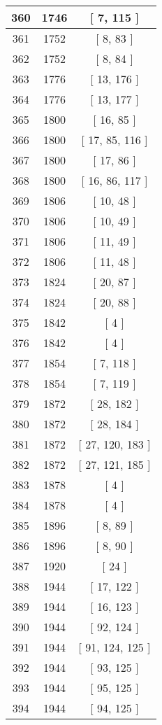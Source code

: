\begin{center}
\begin{longtable}[H]{|| c c c ||}
\hline
360 & 1746 & [ 7, 115 ] \\ 
\hline
361 & 1752 & [ 8, 83 ] \\ 
\hline
362 & 1752 & [ 8, 84 ] \\ 
\hline
363 & 1776 & [ 13, 176 ] \\ 
\hline
364 & 1776 & [ 13, 177 ] \\ 
\hline
365 & 1800 & [ 16, 85 ] \\ 
\hline
366 & 1800 & [ 17, 85, 116 ] \\ 
\hline
367 & 1800 & [ 17, 86 ] \\ 
\hline
368 & 1800 & [ 16, 86, 117 ] \\ 
\hline
369 & 1806 & [ 10, 48 ] \\ 
\hline
370 & 1806 & [ 10, 49 ] \\ 
\hline
371 & 1806 & [ 11, 49 ] \\ 
\hline
372 & 1806 & [ 11, 48 ] \\ 
\hline
373 & 1824 & [ 20, 87 ] \\ 
\hline
374 & 1824 & [ 20, 88 ] \\ 
\hline
375 & 1842 & [ 4 ] \\ 
\hline
376 & 1842 & [ 4 ] \\ 
\hline
377 & 1854 & [ 7, 118 ] \\ 
\hline
378 & 1854 & [ 7, 119 ] \\ 
\hline
379 & 1872 & [ 28, 182 ] \\ 
\hline
380 & 1872 & [ 28, 184 ] \\ 
\hline
381 & 1872 & [ 27, 120, 183 ] \\ 
\hline
382 & 1872 & [ 27, 121, 185 ] \\ 
\hline
383 & 1878 & [ 4 ] \\ 
\hline
384 & 1878 & [ 4 ] \\ 
\hline
385 & 1896 & [ 8, 89 ] \\ 
\hline
386 & 1896 & [ 8, 90 ] \\ 
\hline
387 & 1920 & [ 24 ] \\ 
\hline
388 & 1944 & [ 17, 122 ] \\ 
\hline
389 & 1944 & [ 16, 123 ] \\ 
\hline
390 & 1944 & [ 92, 124 ] \\ 
\hline
391 & 1944 & [ 91, 124, 125 ] \\ 
\hline
392 & 1944 & [ 93, 125 ] \\ 
\hline
393 & 1944 & [ 95, 125 ] \\ 
\hline
394 & 1944 & [ 94, 125 ] \\ 

\end{longtable}
\end{center}
